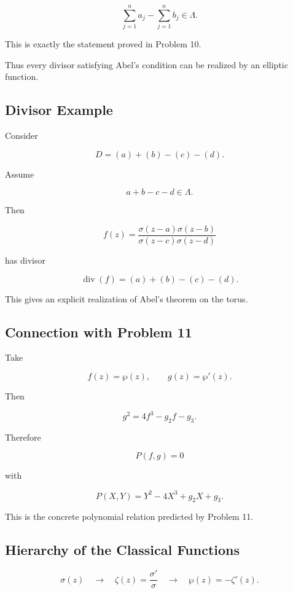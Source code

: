 \documentclass[12pt,a4paper]{article}
\theoremstyle{notespace}
\begin{document}
\[
\boxed{
	\sum_{j=1}^{n}a_j
	-
	\sum_{j=1}^{n}b_j
	\in\Lambda.
}
\]

This is exactly the statement proved in Problem 10.

Thus every divisor satisfying Abel's condition can be realized by an elliptic function.

\subsection{Divisor Example}

Consider

\[
D
=
(a)+(b)-(c)-(d).
\]

Assume

\[
a+b-c-d\in\Lambda.
\]

Then

\[
f(z)
=
\frac{
	\sigma(z-a)\sigma(z-b)
}{
	\sigma(z-c)\sigma(z-d)
}
\]

has divisor

\[
\operatorname{div}(f)
=
(a)+(b)-(c)-(d).
\]

This gives an explicit realization of Abel's theorem on the torus.

\subsection{Connection with Problem 11}

Take

\[
f(z)=\wp(z),
\qquad
g(z)=\wp'(z).
\]

Then

\[
g^2
=
4f^3-g_2f-g_3.
\]

Therefore

\[
P(f,g)=0
\]

with

\[
P(X,Y)
=
Y^2-4X^3+g_2X+g_3.
\]

This is the concrete polynomial relation predicted by Problem 11.

\subsection{Hierarchy of the Classical Functions}

\[
\sigma(z)
\quad
\longrightarrow
\quad
\zeta(z)
=
\frac{\sigma'}{\sigma}
\quad
\longrightarrow
\quad
\wp(z)
=
-\zeta'(z).
\]
\end{document}
